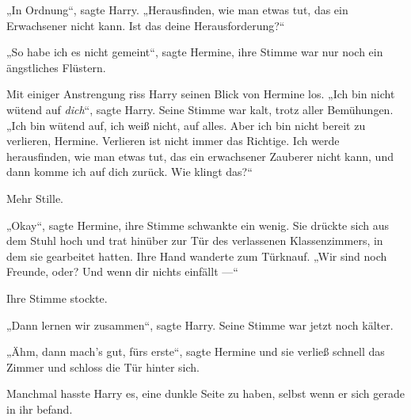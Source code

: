 „In Ordnung“, sagte Harry.
„Herausfinden, wie man etwas tut, das ein Erwachsener nicht kann. Ist das deine Herausforderung?“

„So habe ich es nicht gemeint“, sagte Hermine, ihre Stimme war nur noch ein ängstliches Flüstern.

Mit einiger Anstrengung riss Harry seinen Blick von Hermine los.
„Ich bin nicht wütend auf \emph{dich}“, sagte Harry. Seine Stimme war kalt, trotz aller Bemühungen.
„Ich bin wütend auf, ich weiß nicht, auf alles. Aber ich bin nicht bereit zu verlieren, Hermine. Verlieren ist nicht immer das Richtige. Ich werde herausfinden, wie man etwas tut, das ein erwachsener Zauberer nicht kann, und dann komme ich auf dich zurück. Wie klingt das?“

Mehr Stille.

„Okay“, sagte Hermine, ihre Stimme schwankte ein wenig. Sie drückte sich aus dem Stuhl hoch und trat hinüber zur Tür des verlassenen Klassenzimmers, in dem sie gearbeitet hatten. Ihre Hand wanderte zum Türknauf.
„Wir sind noch Freunde, oder? Und wenn dir nichts einfällt —“

Ihre Stimme stockte.

„Dann lernen wir zusammen“, sagte Harry. Seine Stimme war jetzt noch kälter.

„Ähm, dann mach’s gut, fürs erste“, sagte Hermine und sie verließ schnell das Zimmer und schloss die Tür hinter sich.

Manchmal hasste Harry es, eine dunkle Seite zu haben, selbst wenn er sich gerade in ihr befand.

